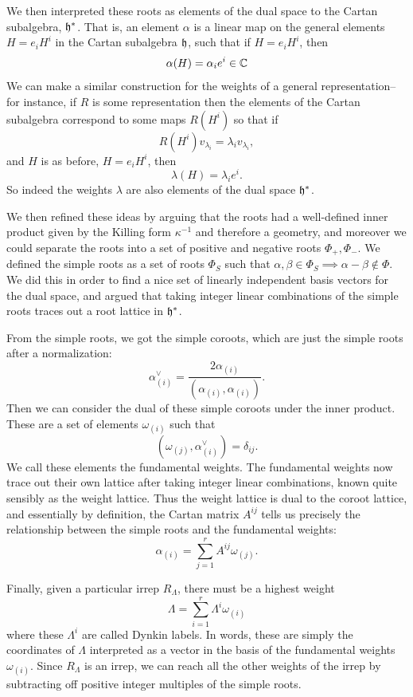 We then interpreted these roots as elements of the dual space to the Cartan subalgebra, $\mathfrak{h}^*$. That is, an element $\alpha$ is a linear map on the general elements $H=e_i H^i$ in the Cartan subalgebra $\mathfrak{h}$, such that if $H=e_i H^i$, then $$\alpha(H)=\alpha_i e^i \in \mathbb{C}$$ We can make a similar construction for the weights of a general representation-- for instance, if $R$ is some representation then the elements of the Cartan subalgebra correspond to some maps $R(H^i)$ so that if
$$R(H^i)v_{\lambda_i}=\lambda_i v_{\lambda_i},$$
and $H$ is as before, $H=e_i H^i$, then $$\lambda(H)=\lambda_i e^i.$$
So indeed the weights $\lambda$ are also elements of the dual space $\mathfrak{h}^*$.

We then refined these ideas by arguing that the roots had a well-defined inner product given by the Killing form $\kappa^{-1}$ and therefore a geometry, and moreover we could separate the roots into a set of positive and negative roots $\Phi_+,\Phi_-$. We defined the simple roots as a set of roots $\Phi_S$ such that $\alpha,\beta\in \Phi_S\implies \alpha-\beta \notin \Phi$. We did this in order to find a nice set of linearly independent basis vectors for the dual space, and argued that taking integer linear combinations of the simple roots traces out a root lattice in $\mathfrak{h}^*$.

From the simple roots, we got the simple coroots, which are just the simple roots after a normalization:
$$\alpha^\vee_{(i)}=\frac{2\alpha_{(i)}}{(\alpha_{(i)},\alpha_{(i)})}.$$ Then we can consider the dual of these simple coroots under the inner product. These are a set of elements $\omega_{(i)}$ such that
$$(\omega_{(j)},\alpha^\vee_{(i)})=\delta_{ij}.$$ We call these elements the fundamental weights. The fundamental weights now trace out their own lattice after taking integer linear combinations, known quite sensibly as the weight lattice. Thus the weight lattice is dual to the coroot lattice, and essentially by definition, the Cartan matrix $A^{ij}$ tells us precisely the relationship between the simple roots and the fundamental weights:
$$\alpha_{(i)}=\sum_{j=1}^r A^{ij}\omega_{(j)}.$$

Finally, given a particular irrep $R_\Lambda$, there must be a highest weight
$$\Lambda=\sum_{i=1}^r \Lambda^i \omega_{(i)}$$
where these $\Lambda^i$ are called Dynkin labels. In words, these are simply the coordinates of $\Lambda$ interpreted as a vector in the basis of the fundamental weights $\omega_{(i)}$. Since $R_\Lambda$ is an irrep, we can reach all the other weights of the irrep by subtracting off positive integer multiples of the simple roots.